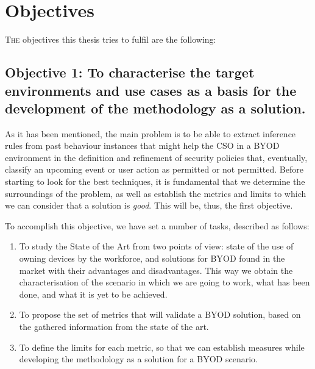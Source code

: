 \section{Objectives}                     
\label{sec:intro:objs}

\lettrine{T}{he} objectives this thesis tries to fulfil are the following:

\newcommand{\objectivescenarios}{To characterise the target environments and use cases as a basis for the development of the methodology as a solution.} 

\subsection*{Objective 1: \objectivescenarios}
\label{subsec:intro:obj:problems}

As it has been mentioned, the main problem %
is to be able to extract inference rules from past behaviour instances that might help the CSO in a BYOD environment in the definition and refinement of security policies that, eventually, classify an upcoming event or user action as permitted or not permitted. Before starting to look for the best techniques, it is fundamental that we determine the surroundings of the problem, as well as establish the metrics and limits to which we can consider that a solution is \textit{good}. This will be, thus, the first objective. 

To accomplish this objective, we have set a number of tasks, described as follows:

\begin{enumerate}
	\item To study the State of the Art from two points of view: state of the use of owning devices by the workforce, and solutions for BYOD found in the market with their advantages and disadvantages. This way we obtain the characterisation of the scenario in which we are going to work, what has been done, and what it is yet to be achieved.
	\item To propose the set of metrics that will validate a BYOD solution, based on the gathered information from the state of the art.
	\item To define the limits for each metric, so that we can establish measures while developing the methodology as a solution for a BYOD scenario. %
\end{enumerate}

